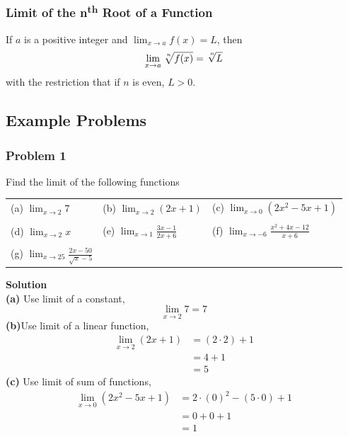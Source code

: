 \documentclass[hidelinks, a4paper, 12pt]{article}
\newcommand{\bd}{\textbf}
\newcommand{\n}{\\[\baselineskip]}
\begin{document}
            \subsubsection{Limit of the n\textsuperscript{th} Root of a Function}
                If $a$ is a positive integer and $\lim_{x\to a}f(x) = L$, then
                \[\lim_{x\to a} \sqrt[\leftroot{-2}\uproot{2}n]{f(x)} = \sqrt[\leftroot{-2}\uproot{2}n]{L}\]
                with the restriction that if $n$ is even, $L > 0$.

        \subsection{Example Problems}
            \subsubsection{Problem 1}
                Find the limit of the following functions
                \begin{center}
                    \begin{tabularx}{\textwidth} {
                        X X X}
                        (a) $\lim_{x\to2} 7$ & (b) $\lim_{x\to2} (2x+1)$ & (c) $\lim_{x\to0} (2x^2 - 5x + 1)$\\ 
                        \\
                        (d) $\lim_{x\to2} x$  & (e) $\lim_{x\to1} \frac{3x-1}{2x+6}$  & (f) $\lim_{x\to-6} \frac{x^2+4x-12}{x+6}$ \\  
                        \\
                        (g) $\lim_{x\to25} \frac{2x-50}{\sqrt{x}-5}$
                    \end{tabularx}
                \end{center}
                \bd{Solution}\n
                \bd{(a)} Use limit of a constant,
                \[\lim_{x\to2} 7 = 7\]
                \bd{(b)}Use limit of a linear function,
                \[\begin{split}
                    \lim_{x\to2} (2x+1) &= (2\cdot2) + 1\\
                    &= 4+ 1\\
                    &=5
                \end{split}\]
                \bd{(c)} Use limit of sum of functions,
                \[\begin{split}
                    \lim_{x\to0} (2x^2 - 5x + 1) &= 2\cdot(0)^2 - (5\cdot 0) + 1\\
                    &= 0 + 0 + 1\\
                    &= 1
                \end{split}\]
\end{document}
